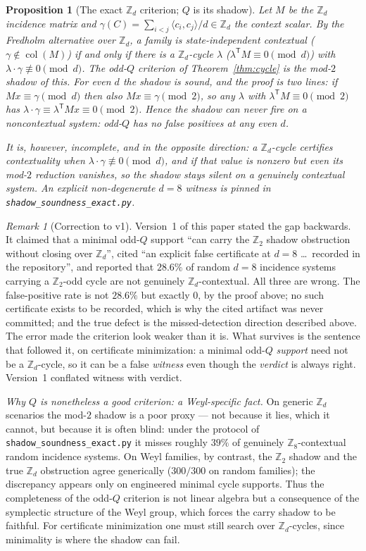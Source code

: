 \documentclass[11pt]{article}
\newtheorem{proposition}[theorem]{Proposition}
\theoremstyle{remark}
\newtheorem{remark}[theorem]{Remark}
\newcommand{\Z}{\mathbb{Z}}
\newcommand{\ip}[2]{\langle #1,#2\rangle}
\DeclareMathOperator{\col}{col}
\begin{document}
\begin{proposition}[The exact $\Z_d$ criterion; $Q$ is its shadow]\label{prop:zd}
Let $M$ be the $\Z_d$ incidence matrix and $\gamma(C)=\sum_{i<j}\ip{c_i}{c_j}/d\in\Z_d$ the context
scalar. By the Fredholm alternative over $\Z_d$, a family is state-independent contextual
($\gamma\notin\col(M)$) if and only if there is a $\Z_d$-cycle $\lambda$
($\lambda^{\mathsf T}M\equiv 0\pmod d$) with $\lambda\cdot\gamma\not\equiv 0\pmod d$. The odd-$Q$
criterion of Theorem~\ref{thm:cycle} is the mod-$2$ shadow of this. For \emph{even} $d$ the shadow
is sound, and the proof is two lines: if $Mx\equiv\gamma\pmod d$ then also $Mx\equiv\gamma\pmod 2$,
so any $\lambda$ with $\lambda^{\mathsf T}M\equiv 0\pmod 2$ has
$\lambda\cdot\gamma\equiv\lambda^{\mathsf T}Mx\equiv 0\pmod 2$. Hence the shadow can \emph{never}
fire on a noncontextual system: odd-$Q$ has no false positives at any even $d$.

It is, however, \emph{incomplete}, and in the opposite direction: a $\Z_d$-cycle certifies
contextuality when $\lambda\cdot\gamma\not\equiv0\pmod d$, and if that value is nonzero but
\emph{even} its mod-$2$ reduction vanishes, so the shadow stays silent on a genuinely contextual
system. An explicit non-degenerate $d=8$ witness is pinned in
\texttt{shadow\_soundness\_exact.py}.
\end{proposition}
\begin{remark}[Correction to v1]\label{rem:v2fix}
Version~1 of this paper stated the gap backwards. It claimed that a minimal odd-$Q$ support
``can carry the $\Z_2$ shadow obstruction without closing over $\Z_d$'', cited ``an explicit false
certificate at $d=8$ \dots\ recorded in the repository'', and reported that $28.6\%$ of random
$d=8$ incidence systems carrying a $\Z_2$-odd cycle are not genuinely $\Z_d$-contextual. All three
are wrong. The false-positive rate is not $28.6\%$ but exactly $0$, by the proof above; no such
certificate exists to be recorded, which is why the cited artifact was never committed; and the
true defect is the missed-detection direction described above. The error made the criterion look
weaker than it is. What survives is the sentence that followed it, on certificate minimization:
a minimal odd-$Q$ \emph{support} need not be a $\Z_d$-cycle, so it can be a false \emph{witness}
even though the \emph{verdict} is always right. Version~1 conflated witness with verdict.
\end{remark}
\noindent\emph{Why $Q$ is nonetheless a good criterion: a Weyl-specific fact.} On generic $\Z_d$
scenarios the mod-$2$ shadow is a poor proxy --- not because it lies, which it cannot, but because
it is often blind: under the protocol of \texttt{shadow\_soundness\_exact.py} it misses roughly
$39\%$ of genuinely $\Z_8$-contextual random incidence systems. On Weyl families, by contrast, the
$\Z_2$ shadow and the true $\Z_d$ obstruction agree generically ($300/300$ on random families); the
discrepancy appears only on engineered minimal cycle supports. Thus the completeness of the odd-$Q$
criterion is not linear algebra but a consequence of the symplectic structure of the Weyl group, which
forces the carry shadow to be faithful. For certificate minimization one must still search over
$\Z_d$-cycles, since minimality is where the shadow can fail.
\end{document}
